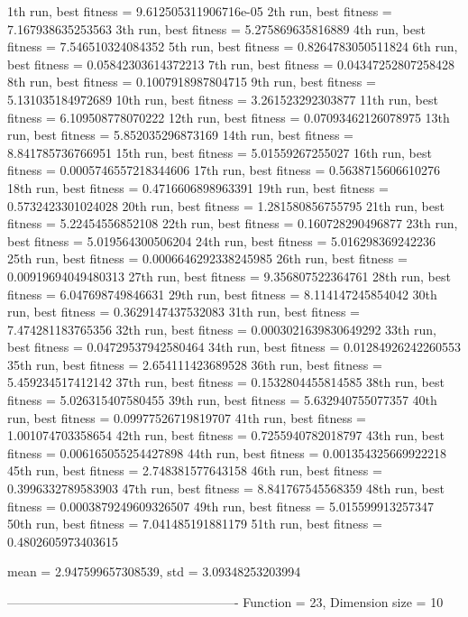 1th run, best fitness = 9.612505311906716e-05
2th run, best fitness = 7.167938635253563
3th run, best fitness = 5.275869635816889
4th run, best fitness = 7.546510324084352
5th run, best fitness = 0.8264783050511824
6th run, best fitness = 0.05842303614372213
7th run, best fitness = 0.04347252807258428
8th run, best fitness = 0.1007918987804715
9th run, best fitness = 5.131035184972689
10th run, best fitness = 3.261523292303877
11th run, best fitness = 6.109508778070222
12th run, best fitness = 0.07093462126078975
13th run, best fitness = 5.852035296873169
14th run, best fitness = 8.841785736766951
15th run, best fitness = 5.01559267255027
16th run, best fitness = 0.0005746557218344606
17th run, best fitness = 0.5638715606610276
18th run, best fitness = 0.4716606898963391
19th run, best fitness = 0.5732423301024028
20th run, best fitness = 1.281580856755795
21th run, best fitness = 5.22454556852108
22th run, best fitness = 0.160728290496877
23th run, best fitness = 5.019564300506204
24th run, best fitness = 5.016298369242236
25th run, best fitness = 0.0006646292338245985
26th run, best fitness = 0.00919694049480313
27th run, best fitness = 9.356807522364761
28th run, best fitness = 6.047698749846631
29th run, best fitness = 8.114147245854042
30th run, best fitness = 0.3629147437532083
31th run, best fitness = 7.474281183765356
32th run, best fitness = 0.0003021639830649292
33th run, best fitness = 0.04729537942580464
34th run, best fitness = 0.01284926242260553
35th run, best fitness = 2.654111423689528
36th run, best fitness = 5.459234517412142
37th run, best fitness = 0.1532804455814585
38th run, best fitness = 5.026315407580455
39th run, best fitness = 5.632940755077357
40th run, best fitness = 0.09977526719819707
41th run, best fitness = 1.001074703358654
42th run, best fitness = 0.7255940782018797
43th run, best fitness = 0.006165055254427898
44th run, best fitness = 0.001354325669922218
45th run, best fitness = 2.748381577643158
46th run, best fitness = 0.3996332789583903
47th run, best fitness = 8.841767545568359
48th run, best fitness = 0.0003879249609326507
49th run, best fitness = 5.015599913257347
50th run, best fitness = 7.041485191881179
51th run, best fitness = 0.4802605973403615

mean = 2.947599657308539, std = 3.09348253203994

-------------------------------------------------------
Function = 23, Dimension size = 10

